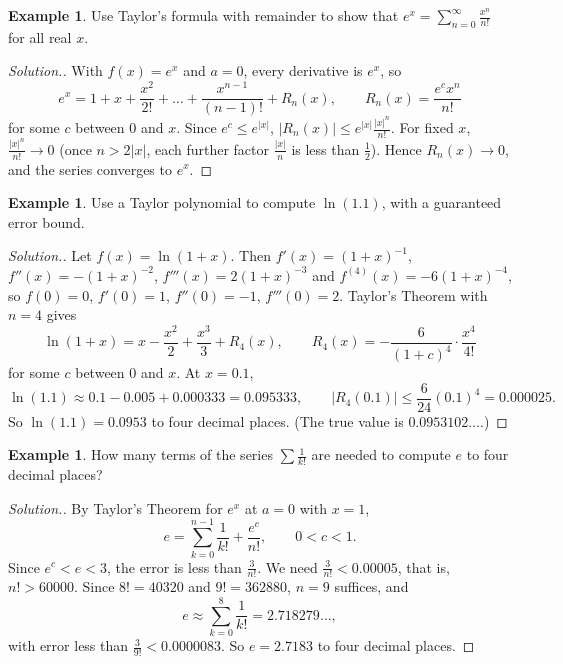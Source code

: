 \documentclass[11pt,a4paper]{article}
\numberwithin{equation}{section}
\theoremstyle{definition}
\newtheorem{exa}[thm]{Example}
\newenvironment{solution}
  {\renewcommand{\qedsymbol}{}\begin{proof}[\textit{Solution}.]}
  {\end{proof}}
\begin{document}
\begin{exa}
Use Taylor's formula with remainder to show that $e^x = \sum^{\infty}_{n = 0} \frac{x^n}{n!}$ for all real $x$.
\end{exa}

\begin{solution}
With $f(x) = e^x$ and $a = 0$, every derivative is $e^x$, so
$$e^x = 1 + x + \frac{x^2}{2!} + \dots + \frac{x^{n -1}}{(n - 1)!} + R_n(x), \qquad R_n(x) = \frac{e^c x^n}{n!}$$
for some $c$ between $0$ and $x$. Since $e^c\leq e^{|x|}$, $|R_n(x)| \leq e^{|x|}\frac{|x|^n}{n!}$. For fixed $x$, $\frac{|x|^n}{n!}\longrightarrow 0$ (once $n>2|x|$, each further factor $\frac{|x|}{n}$ is less than $\frac{1}{2}$). Hence $R_n(x)\longrightarrow 0$, and the series converges to $e^x$.
\end{solution}

\begin{exa}
Use a Taylor polynomial to compute $\ln(1.1)$, with a guaranteed error bound.
\end{exa}

\begin{solution}
Let $f(x) = \ln(1+x)$. Then $f'(x) = (1+x)^{-1}$, $f''(x) = -(1+x)^{-2}$, $f'''(x) = 2(1+x)^{-3}$ and $f^{(4)}(x) = -6(1+x)^{-4}$, so $f(0) = 0$, $f'(0) = 1$, $f''(0) = -1$, $f'''(0) = 2$. Taylor's Theorem with $n=4$ gives
$$\ln(1+x) = x - \frac{x^2}{2} + \frac{x^3}{3} + R_4(x),\qquad R_4(x) = -\frac{6}{(1+c)^4}\cdot\frac{x^4}{4!}$$
for some $c$ between $0$ and $x$. At $x = 0.1$,
$$\ln(1.1)\approx 0.1 - 0.005 + 0.000333 = 0.095333,\qquad |R_4(0.1)|\leq\frac{6}{24}(0.1)^4 = 0.000025 .$$
So $\ln(1.1) = 0.0953$ to four decimal places. (The true value is $0.0953102\ldots$.)
\end{solution}

\begin{exa}
How many terms of the series $\sum\frac{1}{k!}$ are needed to compute $e$ to four decimal places?
\end{exa}

\begin{solution}
By Taylor's Theorem for $e^x$ at $a = 0$ with $x = 1$,
$$e = \sum_{k=0}^{n-1}\frac{1}{k!} + \frac{e^c}{n!},\qquad 0<c<1 .$$
Since $e^c<e<3$, the error is less than $\frac{3}{n!}$. We need $\frac{3}{n!}<0.00005$, that is, $n!>60000$. Since $8! = 40320$ and $9! = 362880$, $n = 9$ suffices, and
$$e\approx\sum_{k=0}^{8}\frac{1}{k!} = 2.718279\ldots,$$
with error less than $\frac{3}{9!}<0.0000083$. So $e = 2.7183$ to four decimal places.
\end{solution}
\end{document}
